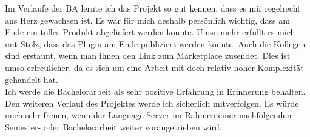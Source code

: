 Im Verlaufe der BA lernte ich das Projekt so gut kennen, dass es mir regelrecht ans Herz gewachsen ist.
Es war für mich deshalb persönlich wichtig, dass am Ende ein tolles Produkt abgeliefert werden konnte.
Umso mehr erfüllt es mich mit Stolz, dass das Plugin am Ende publiziert werden konnte.
Auch die Kollegen sind erstaunt, wenn man ihnen den Link zum Marketplace zusendet.
Dies ist umso erfreulicher, da es sich um eine Arbeit mit doch relativ hoher Komplexität gehandelt hat.\\

Ich werde die Bachelorarbeit als sehr positive Erfahrung in Erinnerung behalten.
Den weiteren Verlauf des Projektes werde ich sicherlich mitverfolgen.
Es würde mich sehr freuen, wenn der Language Server im Rahmen einer nachfolgenden Semester- oder Bachelorarbeit weiter vorangetrieben wird.